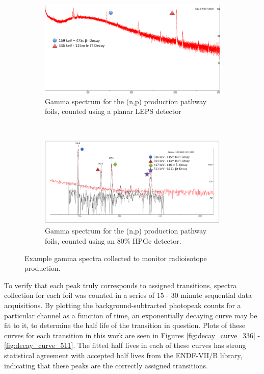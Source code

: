 \documentclass[5p]{elsarticle}
\begin{document}
\begin{figure}[H]
    \centering
    \begin{subfigure}[t]{\textwidth}
        \centering
        \includegraphics[width=5in]{./figures/ti_foils.png}
        \caption{ Gamma spectrum for the (n,p) production pathway foils, counted using a planar LEPS detector}
        \label{fig:spectra_a}
    \end{subfigure}%
    \\
    \begin{subfigure}[t]{\textwidth}
        \centering
        \includegraphics[width=5in]{./figures/Sample_spectra.png}
        \caption{Gamma spectrum for the (n,p) production pathway foils, counted using an 80\% HPGe detector.}
                \label{fig:spectra_b}
    \end{subfigure}
    \caption{Example gamma spectra collected to monitor radioisotope production.}
     \label{fig:main_spectra}
\end{figure}

To verify that each peak truly corresponds to assigned transitions, spectra collection for each foil was counted in a series of 15 - 30 minute sequential data acquisitions. By plotting the background-subtracted photopeak counts for a particular channel as a function of time, an exponentially decaying curve may be fit to it, to determine the half life of the transition in question. Plots of these curves for each transition in this work are seen in Figures \ref{fig:decay_curve_336} - \ref{fig:decay_curve_511}. The fitted half lives in each of these curves has strong statistical agreement with accepted half lives from the ENDF-VII/B library, indicating that these peaks are the correctly assigned transitions.
\end{document}
